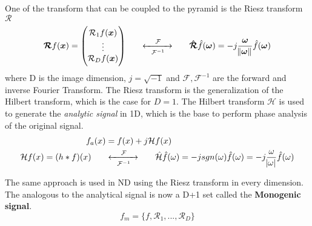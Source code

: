 \documentclass{InsightArticle}
\theoremstyle{definition}
\begin{document}
One of the transform that can be coupled to the pyramid is the Riesz transform $\bm{\mathcal{R}}$
\begin{equation}
\bm{\mathcal{R}} f(\bm{x}) =
  \begin{pmatrix}
    \mathcal{R}_{1} f(\bm{x}) \\
    \vdots \\
    \mathcal{R}_D f(\bm{x})
  \end{pmatrix}
  \hspace{0.6cm}
  \xleftrightarrow[\mathcal{F}^{-1}]{\hspace{0.4cm}\mathcal{F}\hspace{0.4cm}}
  \hspace{0.6cm}
  \bm{\hat{\mathcal{R}}}\hat{f}(\bm{\omega}) = -j \frac{\bm{\omega}}{\norm{\bm{\omega}}}\hat{f}(\bm{\omega})
\end{equation}
where D is the image dimension, $j=\sqrt{-1}$ and $\mathcal{F}, \mathcal{F}^{-1}$ are the forward and inverse Fourier Transform.
The Riesz transform is the generalization of the Hilbert transform, which is the case for $D=1$. The Hilbert transform $\mathcal{H}$ is used to generate the \textit{analytic signal} in 1D, which is the base to perform phase analysis of the original signal.
\begin{equation}
\label{eq:analytic-signal}
\begin{aligned}
  f_a(x) &= f(x) + j \mathcal{H}f(x) \\
  \mathcal{H}f(x) = (h * f)(x)
  \hspace{0.6cm}
  &\xleftrightarrow[\mathcal{F}^{-1}]{\hspace{0.4cm}\mathcal{F}\hspace{0.4cm}}
  \hspace{0.6cm}
  \hat{\mathcal{H}}\hat{f}(\omega) = -jsgn(\omega)\hat{f}(\omega) = -j \frac{\omega}{\abs{\omega}}\hat{f}(\omega)
\end{aligned}
\end{equation}

The same approach is used in ND using the Riesz transform in every dimension.
The analogous to the analytical signal is now a D+1 set called the \textbf{Monogenic signal}\cite{felsberg_monogenic_2001, kovesi_peters_????}.
\begin{equation}
  f_m = \{f, \mathcal{R}_1, ..., \mathcal{R}_D\}
\end{equation}
\end{document}
